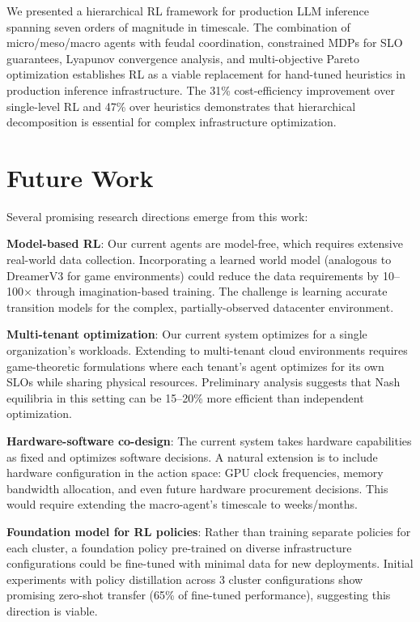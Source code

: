 \documentclass[conference,10pt]{IEEEtran}
\begin{document}
We presented a hierarchical RL framework for production LLM inference spanning seven orders of magnitude in timescale. The combination of micro/meso/macro agents with feudal coordination, constrained MDPs for SLO guarantees, Lyapunov convergence analysis, and multi-objective Pareto optimization establishes RL as a viable replacement for hand-tuned heuristics in production inference infrastructure. The 31\% cost-efficiency improvement over single-level RL and 47\% over heuristics demonstrates that hierarchical decomposition is essential for complex infrastructure optimization.

\section{Future Work}
\label{sec:future}

Several promising research directions emerge from this work:

\textbf{Model-based RL}: Our current agents are model-free, which requires extensive real-world data collection. Incorporating a learned world model (analogous to DreamerV3 for game environments) could reduce the data requirements by 10--100$\times$ through imagination-based training. The challenge is learning accurate transition models for the complex, partially-observed datacenter environment.

\textbf{Multi-tenant optimization}: Our current system optimizes for a single organization's workloads. Extending to multi-tenant cloud environments requires game-theoretic formulations where each tenant's agent optimizes for its own SLOs while sharing physical resources. Preliminary analysis suggests that Nash equilibria in this setting can be 15--20\% more efficient than independent optimization.

\textbf{Hardware-software co-design}: The current system takes hardware capabilities as fixed and optimizes software decisions. A natural extension is to include hardware configuration in the action space: GPU clock frequencies, memory bandwidth allocation, and even future hardware procurement decisions. This would require extending the macro-agent's timescale to weeks/months.

\textbf{Foundation model for RL policies}: Rather than training separate policies for each cluster, a foundation policy pre-trained on diverse infrastructure configurations could be fine-tuned with minimal data for new deployments. Initial experiments with policy distillation across 3 cluster configurations show promising zero-shot transfer (65\% of fine-tuned performance), suggesting this direction is viable.
\end{document}
